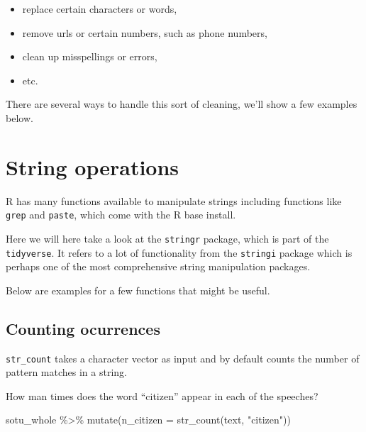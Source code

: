 \documentclass[
]{book}
\newenvironment{Shaded}{\begin{snugshade}}{\end{snugshade}}
\newcommand{\AttributeTok}[1]{\textcolor[rgb]{0.77,0.63,0.00}{#1}}
\newcommand{\FunctionTok}[1]{\textcolor[rgb]{0.00,0.00,0.00}{#1}}
\newcommand{\NormalTok}[1]{#1}
\newcommand{\SpecialCharTok}[1]{\textcolor[rgb]{0.00,0.00,0.00}{#1}}
\newcommand{\StringTok}[1]{\textcolor[rgb]{0.31,0.60,0.02}{#1}}
\providecommand{\tightlist}{%
  \setlength{\itemsep}{0pt}\setlength{\parskip}{0pt}}
\begin{document}
\begin{itemize}
\tightlist
\item
  replace certain characters or words,
\item
  remove urls or certain numbers, such as phone numbers,
\item
  clean up misspellings or errors,
\item
  etc.
\end{itemize}

There are several ways to handle this sort of cleaning, we'll show a few examples below.

\hypertarget{string-operations}{%
\section{String operations}\label{string-operations}}

R has many functions available to manipulate strings including functions like \texttt{grep} and \texttt{paste}, which come with the R base install.

Here we will here take a look at the \texttt{stringr} package, which is part of the \texttt{tidyverse}. It refers to a lot of functionality from the \texttt{stringi} package which is perhaps one of the most comprehensive string manipulation packages.

Below are examples for a few functions that might be useful.

\hypertarget{counting-ocurrences}{%
\subsection{Counting ocurrences}\label{counting-ocurrences}}

\texttt{str\_count} takes a character vector as input and by default counts the number of pattern matches in a string.

How man times does the word ``citizen'' appear in each of the speeches?

\begin{Shaded}
\begin{Highlighting}[]
\NormalTok{sotu\_whole }\SpecialCharTok{\%\textgreater{}\%} 
    \FunctionTok{mutate}\NormalTok{(}\AttributeTok{n\_citizen =} \FunctionTok{str\_count}\NormalTok{(text, }\StringTok{"citizen"}\NormalTok{)) }
\end{Highlighting}
\end{Shaded}
\end{document}
